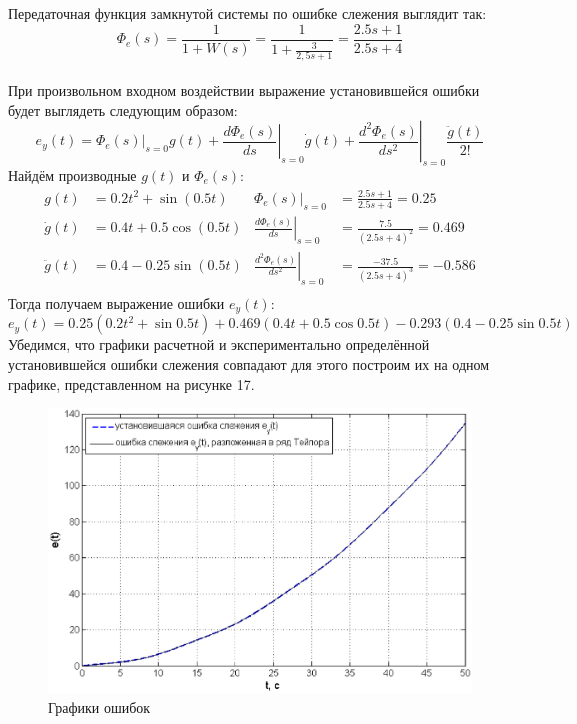\documentclass[12pt,a4paper]{article}
\begin{document}
Передаточная функция замкнутой системы по ошибке слежения выглядит так:
\begin{equation}
   \Phi_e(s) = \frac{1}{1 + W(s)} = \frac{1}{1 + \displaystyle{\frac{3}{2,5s + 1}}} = \frac{2.5s+1}{2.5s+4}
\end{equation}\\
При произвольном входном воздействии выражение установившейся ошибки будет выглядеть следующим образом:
\begin{equation}
    e_y(t) = \Phi_e(s)|_{s=0}g(t) + \left.\frac{d\Phi_e(s)}{ds}\right|_{s=0}\dot{g}(t) + \left.\frac{d^2\Phi_e(s)}{ds^2}\right|_{s=0}\frac{\ddot{g}(t)}{2!}
\end{equation}
Найдём производные $g(t)$ и $\Phi_e(s)$:
\begin{align*}
    g(t) & = 0.2t^2 + \sin{(0.5t)} & \Phi_e(s)|_{s=0} & = \frac{2.5s+1}{2.5s+4} = 0.25 \\
    \dot{g}(t) & = 0.4t + 0.5\cos{(0.5t)} & \left.\frac{d\Phi_e(s)}{ds}\right|_{s=0} & = \frac{7.5}{(2.5s+4)^2} = 0.469 \\
    \ddot{g}(t) & = 0.4 - 0.25\sin{(0.5t)} & \left.\frac{d^2\Phi_e(s)}{ds^2}\right|_{s=0} & = \frac{-37.5}{(2.5s+4)^3} = -0.586 \\
\end{align*}
Тогда получаем выражение ошибки $e_y(t)$:
\begin{equation}
e_y(t) = 0.25(0.2t^2 + \sin{0.5t}) + 0.469(0.4t + 0.5\cos{0.5t}) - 0.293(0.4 - 0.25\sin{0.5t})
\end{equation}
Убедимся, что графики расчетной и экспериментально определённой установившейся ошибки слежения совпадают для этого построим их на одном графике, представленном на рисунке 17.
\begin{figure}[H]
    \centering
    \includegraphics[width=1\linewidth]{4.2.eps}
    \caption{Графики ошибок}
\end{figure}
\end{document}
